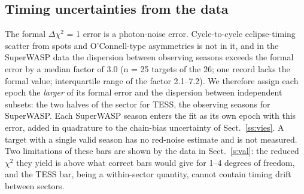 \documentclass{aa}
\begin{document}
\subsection{Timing uncertainties from the data}\label{ss:barras}
The formal $\Delta\chi^2$ = 1 error is a photon-noise error. Cycle-to-cycle eclipse-timing scatter from spots and O'Connell-type asymmetries is not in it, and in the SuperWASP data the dispersion between observing seasons exceeds the formal error by a median factor of 3.0 (n = 25 targets of the 26; one record lacks the formal value; interquartile range of the factor 2.1--7.2). We therefore assign each epoch the \emph{larger} of its formal error and the dispersion between independent subsets: the two halves of the sector for TESS, the observing seasons for SuperWASP. Each SuperWASP season enters the fit as its own epoch with this error, added in quadrature to the chain-bias uncertainty of Sect.~\ref{ss:vies}. A target with a single valid season has no red-noise estimate and is not measured. Two limitations of these bars are shown by the data in Sect.~\ref{s:val}: the reduced $\chi^2$ they yield is above what correct bars would give for 1--4 degrees of freedom, and the TESS bar, being a within-sector quantity, cannot contain timing drift between sectors.
\end{document}
